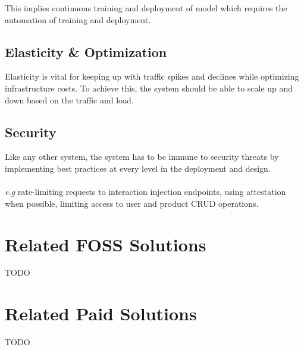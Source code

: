 This implies continuous training and deployment of model which requires the automation of training and deployment.

\subsection{Elasticity \& Optimization}

Elasticity is vital for keeping up with traffic spikes and declines while optimizing infrastructure costs. To achieve this, the system should be able to scale up and down based on the traffic and load.

\subsection{Security}

Like any other system, the system has to be immune to security threats by implementing best practices at every level in the deployment and design. \\ \\
\textit{e.g} rate-limiting requests to interaction injection endpoints, using attestation when possible, limiting access to user and product CRUD operations.

\section{Related FOSS Solutions}

TODO

\section{Related Paid Solutions}

TODO